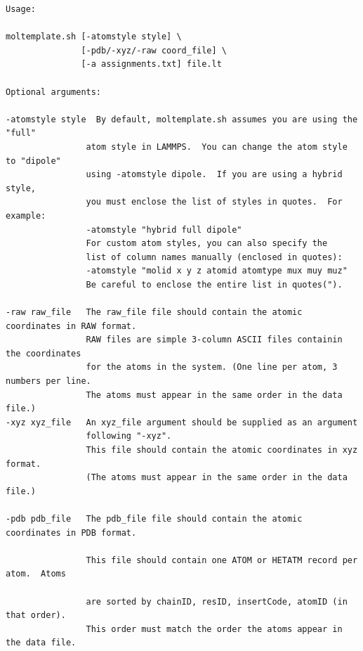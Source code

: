 \documentclass[11pt]{article}
\begin{document}
\begin{verbatim}
Usage:

moltemplate.sh [-atomstyle style] \
               [-pdb/-xyz/-raw coord_file] \
               [-a assignments.txt] file.lt

Optional arguments:

-atomstyle style  By default, moltemplate.sh assumes you are using the "full"
                atom style in LAMMPS.  You can change the atom style to "dipole"
                using -atomstyle dipole.  If you are using a hybrid style, 
                you must enclose the list of styles in quotes.  For example:
                -atomstyle "hybrid full dipole"
                For custom atom styles, you can also specify the
                list of column names manually (enclosed in quotes):
                -atomstyle "molid x y z atomid atomtype mux muy muz"
                Be careful to enclose the entire list in quotes(").

-raw raw_file   The raw_file file should contain the atomic coordinates in RAW format.
                RAW files are simple 3-column ASCII files containin the coordinates
                for the atoms in the system. (One line per atom, 3 numbers per line.
                The atoms must appear in the same order in the data file.)
-xyz xyz_file   An xyz_file argument should be supplied as an argument
                following "-xyz".
                This file should contain the atomic coordinates in xyz format.
                (The atoms must appear in the same order in the data file.)

-pdb pdb_file   The pdb_file file should contain the atomic coordinates in PDB format.

                This file should contain one ATOM or HETATM record per atom.  Atoms

                are sorted by chainID, resID, insertCode, atomID (in that order).
                This order must match the order the atoms appear in the data file.


\end{verbatim}
\end{document}
